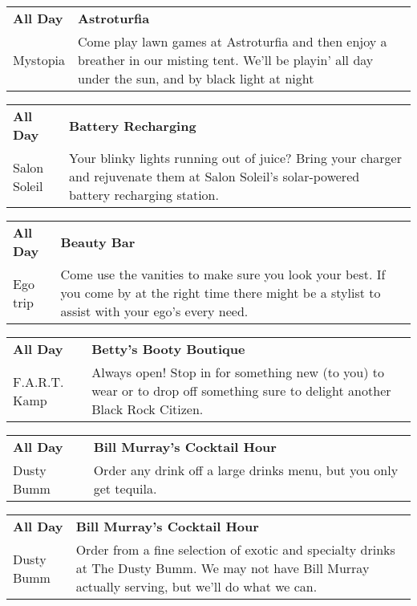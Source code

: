 \begin{tabular}{ p{1in} p{2.2in} }
    \textbf{All Day} & \textbf{Astroturfia} \\
    Mystopia \newline  & Come play lawn games at Astroturfia and then enjoy a breather in our misting tent. We'll be playin' all day under the sun, and by black light at night \\
    \hline 
\end{tabular}
    
\begin{tabular}{ p{1in} p{2.2in} }
    \textbf{All Day} & \textbf{Battery Recharging} \\
    Salon Soleil \newline  & Your blinky lights running out of juice? Bring your charger and rejuvenate them at Salon Soleil's solar-powered battery recharging station. \\
    \hline 
\end{tabular}
    
\begin{tabular}{ p{1in} p{2.2in} }
    \textbf{All Day} & \textbf{Beauty Bar} \\
    Ego trip \newline  & Come use the vanities to make sure you look your best. If you come by at the right time there might be a stylist to assist with your ego's every need. \\
    \hline 
\end{tabular}
    
\begin{tabular}{ p{1in} p{2.2in} }
    \textbf{All Day} & \textbf{Betty's Booty Boutique} \\
    F.A.R.T. Kamp \newline  & Always open! Stop in for something new (to you) to wear or to drop off something sure to delight another Black Rock Citizen. \\
    \hline 
\end{tabular}
    
\begin{tabular}{ p{1in} p{2.2in} }
    \textbf{All Day} & \textbf{Bill Murray's Cocktail Hour} \\
    Dusty Bumm \newline  & Order any drink off a large drinks menu, but you only get tequila. \\
    \hline 
\end{tabular}
    
\begin{tabular}{ p{1in} p{2.2in} }
    \textbf{All Day} & \textbf{Bill Murray's Cocktail Hour} \\
    Dusty Bumm \newline  & Order from a fine selection of exotic and specialty drinks at The Dusty Bumm. We may not have Bill Murray actually serving, but we'll do what we can. \\
    \hline 
\end{tabular}
    
